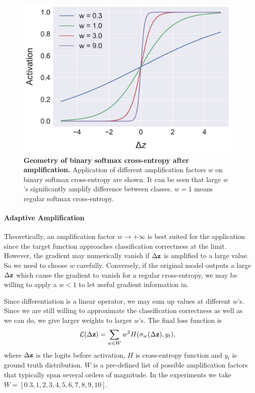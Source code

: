 \documentclass{article}
\begin{document}
        \begin{figure}[ht]
            \centering
            \includegraphics[width=0.5\linewidth]{figs/bin_amp_geo.pdf}
            \caption{\textbf{Geometry of binary softmax cross-entropy after amplification.} Application of different amplification factors $w$ on binary softmax cross-entropy are shown. It can be seen that large $w$'s significantly amplify difference between classes. $w = 1$ means regular softmax cross-entropy.}
            \label{fig:softmax_preamp}
        \end{figure}

        \paragraph{Adaptive Amplification} Theoretically, an amplification factor $w \to +\infty$ is best suited for the application since the target function approaches classification correctness at the limit. However, the gradient may numerically vanish if $\Delta \mathbf{z}$ is amplified to a large value. So we need to choose $w$ carefully. Conversely, if the original model outputs a large $\Delta \mathbf{z}$ which cause the gradient to vanish for a regular cross-entropy, we may be willing to apply a $w < 1$ to let useful gradient information in.

        Since differentiation is a linear operator, we may sum up values at different $w$'s. Since we are still willing to approximate the classification correctness as well as we can do, we give larger weights to larger $w$'s. The final loss function is
        \begin{equation}
            \mathcal{L}(\Delta \mathbf{z}) = \sum_{w \in W} w^2 H(\sigma_w(\Delta \mathbf{z}), y_t),
        \end{equation}
        where $\Delta \mathbf{z}$ is the logits before activation, $H$ is cross-entropy function and $y_t$ is ground truth distribution. $W$ is a pre-defined list of possible amplification factors that typically span several orders of magnitude. In the experiments we take $W = [0.3, 1, 2, 3, 4, 5, 6, 7, 8, 9, 10]$.
\end{document}
